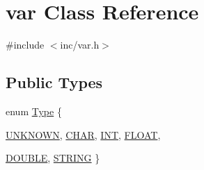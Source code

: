 \hypertarget{classvar}{
\section{var Class Reference}
\label{classvar}
}


{\ttfamily \#include $<$inc/var.h$>$}\subsection*{Public Types}
\begin{DoxyCompactItemize}
\item 
enum \hyperlink{classvar_ae4f9e2c747c3e72f245b148146b1855e}{Type} \{ \par
\hyperlink{classvar_ae4f9e2c747c3e72f245b148146b1855ea0f04795086058cdfd618ce292cc10f7b}{UNKNOWN}, 
\hyperlink{classvar_ae4f9e2c747c3e72f245b148146b1855eae9bfb9b218ebe0917ff49ad2dc74eea8}{CHAR}, 
\hyperlink{classvar_ae4f9e2c747c3e72f245b148146b1855eae8b4ab776b56b78d2f219c9666e6ffbf}{INT}, 
\hyperlink{classvar_ae4f9e2c747c3e72f245b148146b1855ead10e07906d918cec495207e33b00256a}{FLOAT}, 
\par
\hyperlink{classvar_ae4f9e2c747c3e72f245b148146b1855ea645fb8aa32f88e2b580ab65fe3a0a234}{DOUBLE}, 
\hyperlink{classvar_ae4f9e2c747c3e72f245b148146b1855ea7a154d7312f6d12c9031819ad3dfef71}{STRING}
 \}
\end{DoxyCompactItemize}
